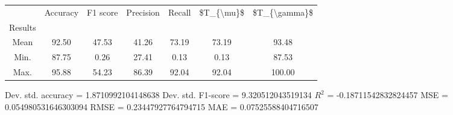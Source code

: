 \begin{tabular}{|c|c|c|c|c|c|c|}
\toprule
{} &  Accuracy &  F1 score &  Precision &  Recall &  \$T\_\{\textbackslash mu\}\$ &  \$T\_\{\textbackslash gamma\}\$ \\
Results &           &           &            &         &            &               \\
\hline
Mean    &     92.50 &     47.53 &      41.26 &   73.19 &      73.19 &         93.48 \\
Min.    &     87.75 &      0.26 &      27.41 &    0.13 &       0.13 &         87.53 \\
Max.    &     95.88 &     54.23 &      86.39 &   92.04 &      92.04 &        100.00 \\
\bottomrule
\end{tabular}

 Dev. std. accuracy = 1.8710992104148638
 Dev. std. F1-score = 9.320512043519134
 $R^2$ = -0.18711542832824457
 MSE = 0.054980531646303094
 RMSE = 0.23447927764794715
 MAE = 0.07525588404716507